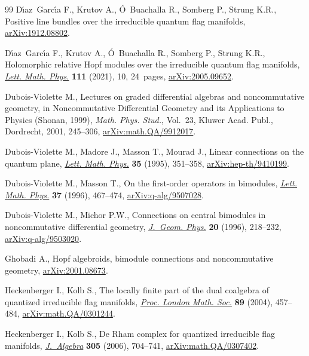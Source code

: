 \documentclass[10pt,a4paper]{amsart}
\numberwithin{equation}{section}
\begin{document}
\begin{thebibliography}{99}
D\'{\i}az~Garc\'{\i}a F., Krutov A., \'O~Buachalla R., Somberg P., Strung K.R.,
 Positive line bundles over the irreducible quantum flag manifolds, \href{https://arxiv.org/abs/1912.08802}{arXiv:1912.08802}.

D\'{\i}az~Garc\'{\i}a F., Krutov A., \'O~Buachalla R., Somberg P., Strung K.R.,
 Holomorphic relative {H}opf modules over the irreducible quantum flag
 manifolds, \href{https://doi.org/10.1007/s11005-020-01340-7}{\textit{Lett. Math. Phys.}} \textbf{111} (2021), 10, 24~pages,
 \href{https://arxiv.org/abs/2005.09652}{arXiv:2005.09652}.

Dubois-Violette M., Lectures on graded differential algebras and noncommutative
 geometry, in Noncommutative Differential Geometry and its Applications to
 Physics ({S}honan, 1999), \textit{Math. Phys. Stud.}, Vol.~23, Kluwer Acad.
 Publ., Dordrecht, 2001, 245--306, \href{https://arxiv.org/abs/math.QA/9912017}{arXiv:math.QA/9912017}.

Dubois-Violette M., Madore J., Masson T., Mourad J., Linear connections on the
 quantum plane, \href{https://doi.org/10.1007/BF00750842}{\textit{Lett. Math. Phys.}} \textbf{35} (1995), 351--358,
 \href{https://arxiv.org/abs/hep-th/9410199}{arXiv:hep-th/9410199}.

Dubois-Violette M., Masson T., On the first-order operators in bimodules,
 \href{https://doi.org/10.1007/BF00312677}{\textit{Lett. Math. Phys.}} \textbf{37} (1996), 467--474,
 \href{https://arxiv.org/abs/q-alg/9507028}{arXiv:q-alg/9507028}.

Dubois-Violette M., Michor P.W., Connections on central bimodules in
 noncommutative differential geometry, \href{https://doi.org/10.1016/0393-0440(95)00057-7}{\textit{J.~Geom. Phys.}} \textbf{20}
 (1996), 218--232, \href{https://arxiv.org/abs/q-alg/9503020}{arXiv:q-alg/9503020}.

Ghobadi A., Hopf algebroids, bimodule connections and noncommutative geometry,
 \href{https://arxiv.org/abs/2001.08673}{arXiv:2001.08673}.

Heckenberger I., Kolb S., The locally finite part of the dual coalgebra of
 quantized irreducible flag manifolds, \href{https://doi.org/10.1112/S0024611504014777}{\textit{Proc. London Math. Soc.}}
 \textbf{89} (2004), 457--484, \href{https://arxiv.org/abs/math.QA/0301244}{arXiv:math.QA/0301244}.

Heckenberger I., Kolb S., De {R}ham complex for quantized irreducible flag
 manifolds, \href{https://doi.org/10.1016/j.jalgebra.2006.02.001}{\textit{J.~Algebra}} \textbf{305} (2006), 704--741,
 \href{https://arxiv.org/abs/math.QA/0307402}{arXiv:math.QA/0307402}.


\end{thebibliography}
\end{document}
